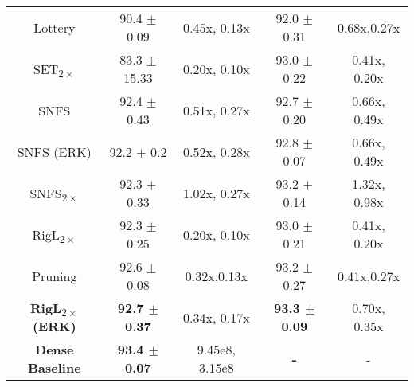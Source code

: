 \begin{table}[t]
\begin{tabular}{ c cc cc }
    Lottery & 
    {90.4 $\pm$ 0.09} & {0.45x, 0.13x} & 
    {92.0 $\pm$ 0.31} & {0.68x,0.27x} \\
    
    {SET\textsubscript{$2 \times$}} &
    {83.3 $\pm$ 15.33} & {0.20x, 0.10x} &
    {93.0 $\pm$ 0.22} & {0.41x, 0.20x} \\
    
    SNFS & 
    {92.4 $\pm$ 0.43} & {0.51x, 0.27x} & 
    {92.7 $\pm$ 0.20} & {0.66x, 0.49x} \\ 
    
    SNFS (ERK)& 
    {92.2 $\pm$ 0.2} & {0.52x, 0.28x} & 
    {92.8 $\pm$ 0.07} & {0.66x, 0.49x} \\
    
    {SNFS\textsubscript{$2 \times$}} &
    {92.3 $\pm$ 0.33} & {1.02x, 0.27x} &
    {93.2 $\pm$ 0.14} & {1.32x, 0.98x} \\
    
    {RigL\textsubscript{$2 \times$}} &
    {92.3 $\pm$ 0.25} & {0.20x, 0.10x} &
    {93.0 $\pm$ 0.21} & {0.41x, 0.20x} \\
    
    
    {Pruning} & 
    {92.6 $\pm$ 0.08} & {0.32x,0.13x} & 
    {93.2 $\pm$ 0.27} & {0.41x,0.27x} \\ 
    
    \textbf{RigL\textsubscript{$2 \times$} (ERK)} &
    \textbf{92.7 $\pm$ 0.37} & {0.34x, 0.17x} &
    \textbf{93.3 $\pm$ 0.09} & {0.70x, 0.35x} \\
    \midrule
    
    \textbf{Dense Baseline} &
    \textbf{93.4 $\pm$ 0.07} & {9.45e8, 3.15e8} &
    \textbf{-} & {-} \\
    \bottomrule
    
    \end{tabular}
\end{table}